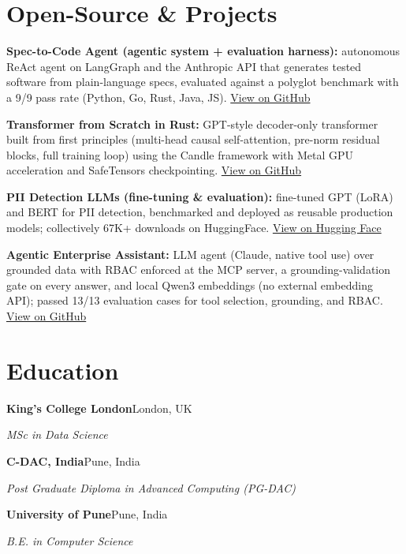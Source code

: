 \documentclass[10pt,a4paper]{article}
\begin{document}
\section{Open-Source \& Projects}
\begin{tight}
  \item \textbf{Spec-to-Code Agent (agentic system + evaluation harness):} autonomous ReAct agent on LangGraph and the Anthropic API that generates tested software from plain-language specs, evaluated against a polyglot benchmark with a 9/9 pass rate (Python, Go, Rust, Java, JS). \href{https://github.com/abhijeetscode/Spec-to-Code-Agent}{View on GitHub}
  \item \textbf{Transformer from Scratch in Rust:} GPT-style decoder-only transformer built from first principles (multi-head causal self-attention, pre-norm residual blocks, full training loop) using the Candle framework with Metal GPU acceleration and SafeTensors checkpointing. \href{https://github.com/abhijeetscode/transformer-rust}{View on GitHub}
  \item \textbf{PII Detection LLMs (fine-tuning \& evaluation):} fine-tuned GPT (LoRA) and BERT for PII detection, benchmarked and deployed as reusable production models; collectively 67K+ downloads on HuggingFace. \href{https://huggingface.co/ab-ai/pii_model}{View on Hugging Face}
  \item \textbf{Agentic Enterprise Assistant:} LLM agent (Claude, native tool use) over grounded data with RBAC enforced at the MCP server, a grounding-validation gate on every answer, and local Qwen3 embeddings (no external embedding API); passed 13/13 evaluation cases for tool selection, grounding, and RBAC. \href{https://github.com/abhijeetscode/Agentic-Enterprise-Assistant}{View on GitHub}
\end{tight}

\section{Education}
{\color{company}\bfseries King's College London}\hfill {\color{muted}London, UK}\par
{\itshape MSc in Data Science}\par\vspace{2pt}
{\color{company}\bfseries C-DAC, India}\hfill {\color{muted}Pune, India}\par
{\itshape Post Graduate Diploma in Advanced Computing (PG-DAC)}\par\vspace{2pt}
{\color{company}\bfseries University of Pune}\hfill {\color{muted}Pune, India}\par
{\itshape B.E. in Computer Science}\par
\end{document}
